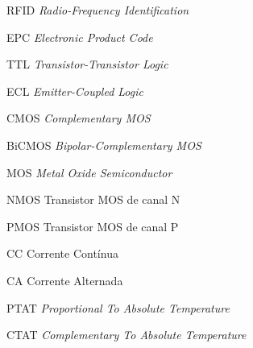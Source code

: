 \clearpage
\renewcommand{\listadesiglasname}{Lista de siglas e abreviaturas}
\begin{siglas}
	\item[RFID] \textit{Radio-Frequency Identification}
	\item[EPC] \textit{Electronic Product Code}
	\item[TTL] \textit{Transistor-Transistor Logic}
	\item[ECL] \textit{Emitter-Coupled Logic}
	\item[CMOS] \textit{Complementary MOS}
	\item[BiCMOS] \textit{Bipolar-Complementary MOS}
	\item[MOS] \textit{Metal Oxide Semiconductor}
	\item[NMOS] Transistor MOS de canal N
	\item[PMOS] Transistor MOS de canal P
	\item[CC] Corrente Contínua
	\item[CA] Corrente Alternada
	\item[PTAT] \textit{Proportional To Absolute Temperature}
	\item[CTAT] \textit{Complementary To Absolute Temperature}
\end{siglas}

\clearpage
{} %
\tableofcontents*

\clearpage